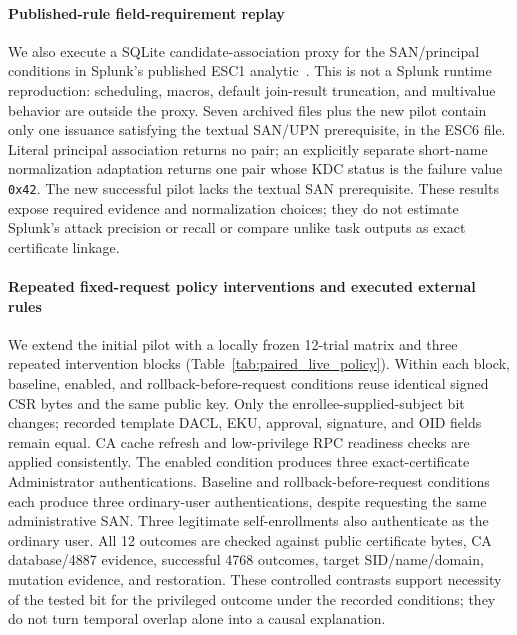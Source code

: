 \paragraph{Published-rule field-requirement replay}
We also execute a SQLite candidate-association proxy for the SAN/principal conditions in Splunk's published ESC1 analytic~\cite{splunk2026esc1}. This is not a Splunk runtime reproduction: scheduling, macros, default join-result truncation, and multivalue behavior are outside the proxy. Seven archived files plus the new pilot contain only one issuance satisfying the textual SAN/UPN prerequisite, in the ESC6 file. Literal principal association returns no pair; an explicitly separate short-name normalization adaptation returns one pair whose KDC status is the failure value \texttt{0x42}. The new successful pilot lacks the textual SAN prerequisite. These results expose required evidence and normalization choices; they do not estimate Splunk's attack precision or recall or compare unlike task outputs as exact certificate linkage.



\paragraph{Repeated fixed-request policy interventions and executed external rules}
We extend the initial pilot with a locally frozen 12-trial matrix and three repeated intervention blocks (Table~\ref{tab:paired_live_policy}). Within each block, baseline, enabled, and rollback-before-request conditions reuse identical signed CSR bytes and the same public key. Only the enrollee-supplied-subject bit changes; recorded template DACL, EKU, approval, signature, and OID fields remain equal. CA cache refresh and low-privilege RPC readiness checks are applied consistently. The enabled condition produces three exact-certificate Administrator authentications. Baseline and rollback-before-request conditions each produce three ordinary-user authentications, despite requesting the same administrative SAN. Three legitimate self-enrollments also authenticate as the ordinary user. All 12 outcomes are checked against public certificate bytes, CA database/4887 evidence, successful 4768 outcomes, target SID/name/domain, mutation evidence, and restoration. These controlled contrasts support necessity of the tested bit for the privileged outcome under the recorded conditions; they do not turn temporal overlap alone into a causal explanation.

